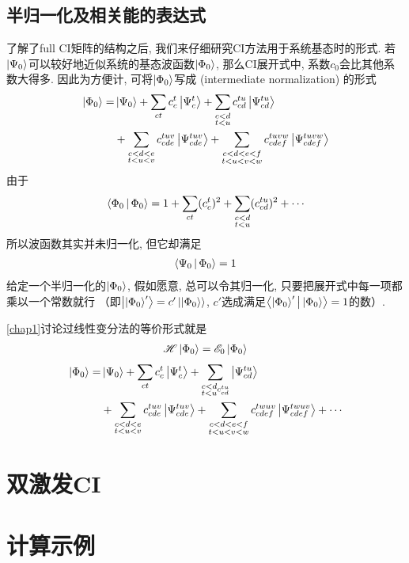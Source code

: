 \subsection{半归一化及相关能的表达式}
了解了full CI矩阵的结构之后, 我们来仔细研究CI方法用于系统基态时的形式. 若$\Ket{\Psi_0}$可以较好地近似系统的基态波函数$\Ket{\Phi_0}$, 那么CI展开式中, 系数$c_0$会比其他系数大得多. 因此为方便计, 可将$\Ket{\Phi_0}$写成\emph{} (intermediate normalization) 的形式
\begin{align}
\Ket{\Phi_0} =& \Ket{\Psi_0} + \sum_{ct}c_c^t\Ket{\Psi_c^t} + \sum_{\substack{c<d\\t<u}} c_{cd}^{tu}\Ket{\Psi_{cd}^{tu}}\notag\\
&+\sum_{\substack{c<d<e\\t<u<v}} c_{cde}^{tuv}\Ket{\Psi_{cde}^{tuv}} +\sum_{\substack{c<d<e<f\\t<u<v<w}} c_{cdef}^{tuvw}\Ket{\Psi_{cdef}^{tuvw}}
\end{align}
由于
\begin{align}
\Braket{\Phi_0|\Phi_0} = 1 + \sum_{ct}(c_c^t)^2 + \sum_{\substack{c<d\\t<u}} (c_{cd}^{tu})^2 + \cdots
\end{align}
所以波函数其实并未归一化, 但它却满足
\begin{align}
\Braket{\Psi_0|\Phi_0} =1
\end{align}
给定一个半归一化的$\Ket{\Phi_0}$, 假如愿意, 总可以令其归一化, 只要把展开式中每一项都乘以一个常数就行 （即$\Ket{\Ket{\Phi_0}'}=c'\Ket{\Ket{\Phi_0}}$, $c'$选成满足$\Braket{\Ket{\Phi_0}'|\Ket{\Phi_0}}=1$的数）.

\ref{chap1}讨论过线性变分法的等价形式就是
\begin{align}
\mathscr{H}\Ket{\Phi_0} = \mathscr{E}_0\Ket{\Phi_0}
\end{align}
\begin{align}
\Ket{\Phi_0} = &\Ket{\Psi_0}+\sum_{ct}c_c^t\Ket{\Psi_{c}^t} + \sum_{\substack{c<d\\t<u}c_{cd}^{tu}}\Ket{\Psi_{cd}^{tu}}\notag\\
& + \sum_{\substack{c<d<e\\t<u<v}}c_{cde}^{tuv}\Ket{\Psi_{cde}^{tuv}}+ \sum_{\substack{c<d<e<f\\t<u<v<w}}c_{cdef}^{twuv}\Ket{\Psi_{cdef}^{twuv}} + \cdots
\end{align}
\section{双激发CI}\mbox{}
\section{计算示例}\mbox{}
